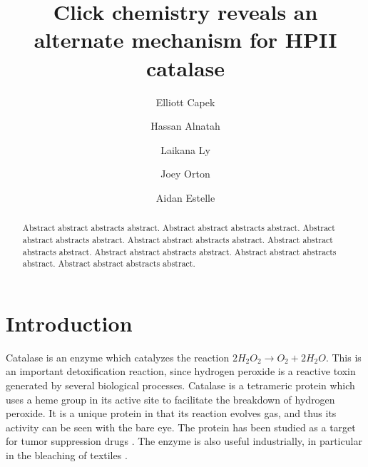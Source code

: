 \documentclass[journal=jacsat,manuscript=article]{achemso}
\author{Elliott Capek}
\affiliation{Department of Biochemistry, Oregon State University}
\author{Hassan Alnatah}
\author{Laikana Ly}
\author{Joey Orton}
\author{Aidan Estelle}
\title[]{Click chemistry reveals an alternate mechanism for HPII catalase}
\begin{document}
\begin{abstract}

  Abstract abstract abstracts abstract. Abstract abstract abstracts abstract. Abstract abstract abstracts abstract. Abstract abstract abstracts abstract. Abstract abstract abstracts abstract. Abstract abstract abstracts abstract. Abstract abstract abstracts abstract. Abstract abstract abstracts abstract.\\
\end{abstract}

\section{Introduction}
Catalase is an enzyme which catalyzes the reaction $2H_2O_2 \rightarrow O_2 + 2H_2O$. This is an important detoxification reaction, since hydrogen peroxide is a reactive toxin generated by several biological processes. Catalase is a tetrameric protein which uses a heme group in its active site to facilitate the breakdown of hydrogen peroxide. It is a unique protein in that its reaction evolves gas, and thus its activity can be seen with the bare eye. The protein has been studied as a target for tumor suppression drugs \cite{bauer}. The enzyme is also useful industrially, in particular in the bleaching of textiles \cite{amorim}.
\end{document}
